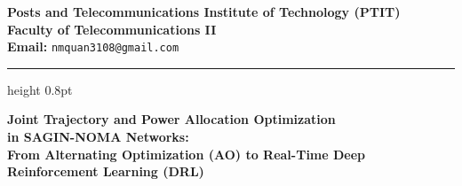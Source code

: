 \documentclass[11pt,a4paper]{article}
\begin{document}
\noindent
\begin{minipage}[t]{0.75\textwidth}
    \textbf{Posts and Telecommunications Institute of Technology (PTIT)}\\
    \textbf{Faculty of Telecommunications II}\\[0.12cm]
    \small \textbf{Email:} \texttt{nmquan3108@gmail.com}
\end{minipage}%
\hfill

\vspace{0.25cm}
\hrule height 0.8pt
\vspace{0.8cm}

\begin{center}
    {\LARGE \textbf{Joint Trajectory and Power Allocation Optimization\\[0.25cm]
    in SAGIN-NOMA Networks:\\[0.28cm]
    From Alternating Optimization (AO) to Real-Time Deep Reinforcement Learning (DRL)}}\\[0.6cm]
\end{center}











\renewcommand{\refname}{References}


\end{document}
